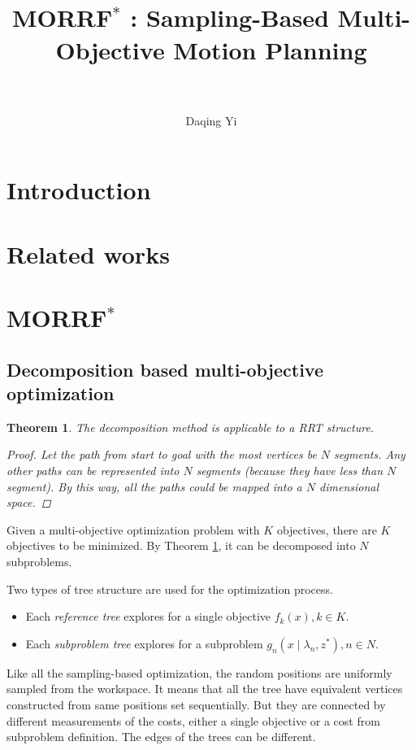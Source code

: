 \documentclass[paper=a4, fontsize=11pt]{scrartcl}
\title{
		\normalfont
		\horrule{0.5pt} \\[0.4cm]
		\huge MORRF$^{*}$ : Sampling-Based Multi-Objective Motion Planning \\
		\horrule{2pt} \\[0.5cm]
}
\author{
		\normalfont %
        Daqing Yi \\
}
\newtheorem{thm}{Theorem}
\begin{document}
\maketitle

\section{Introduction}

\section{Related works}

\section{MORRF$^{*}$}

\subsection{Decomposition based multi-objective optimization}


\begin{thm}
\label{thm:moo-d:rrt}
The decomposition method is applicable to a RRT structure.
\begin{proof}
Let the path from start to goal with the most vertices be $ N $ segments.
Any other paths can be represented into $ N $ segments (because they have less than $ N $ segment).
By this way, all the paths could be mapped into a $ N $ dimensional space.
\end{proof}
\end{thm}

Given a multi-objective optimization problem with $ K $ objectives,
there are $ K $ objectives to be minimized. 
By Theorem \ref{thm:moo-d:rrt}, it can be decomposed into $ N $ subproblems.

Two types of tree structure are used for the optimization process.
\begin{itemize}
\item Each \emph{reference tree} explores for a single objective $ f_{k} (x), k \in K $. 
\item Each \emph{subproblem tree} explores for a subproblem $ g_{n} ( x \mid \lambda_{n} , z^{*} ) , n \in N $.
\end{itemize}

Like all the sampling-based optimization, the random positions are uniformly sampled from the workspace.
It means that all the tree have equivalent vertices constructed from same positions set sequentially.
But they are connected by different measurements of the costs, either a single objective or a cost from subproblem definition.
The edges of the trees can be different.
\end{document}

